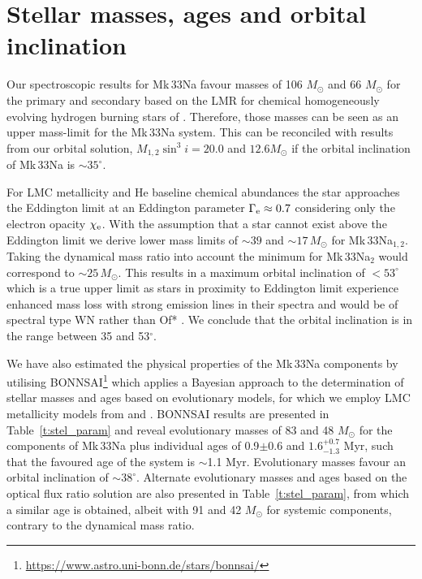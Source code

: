 \documentclass[fleqn,usenatbib]{mnras}
\begin{document}
\section{Stellar masses, ages and orbital inclination}\label{s:mass_age_i}

Our spectroscopic  results for Mk\,33Na favour masses of 106 $M_{\odot}$ and 66 $M_{\odot}$ for the primary and secondary based on the LMR for chemical homogeneously evolving hydrogen burning stars of \cite{graefener2011}. Therefore, those masses can be seen as an upper mass-limit for the Mk\,33Na system. This can be reconciled with results from our orbital solution, $M_{1,2} \sin^3 i = 20.0$ and $12.6 M_{\odot}$ if the orbital inclination of Mk\,33Na is $\sim 35^{\circ}$.

For LMC metallicity and He baseline chemical abundances the star approaches the Eddington limit at an Eddington parameter $\Gamma_{\rm e} \approx 0.7$ considering only the electron opacity $\chi_{\rm e}$. With the assumption that a star cannot exist above the Eddington limit we derive lower mass limits of $\sim 39$ and $\sim 17\,M_{\odot}$ for Mk\,33Na$_{1,2}$. Taking the dynamical mass ratio into account the minimum for Mk\,33Na$_{2}$ would correspond to $\sim 25\,M_{\odot}$. This results in a maximum orbital inclination of $< 53^{\circ}$ which is a true upper limit as stars in proximity to Eddington limit experience enhanced mass loss with strong emission lines in their spectra and would be of spectral type WN rather than Of* \citep[e.g.][]{bestenlehner2014, bestenlehner2020}. We conclude that the orbital inclination is in the range between 35 and 53$^{\circ}$.

We have also estimated the physical properties of the Mk\,33Na components by utilising BONNSAI\footnote{\url{https://www.astro.uni-bonn.de/stars/bonnsai/}} \cite{schneider2014} which applies a Bayesian approach to the determination of stellar masses and ages based on evolutionary models, for which we employ LMC metallicity models from \citet{brott2011} and \citet{koehler2015}. BONNSAI results are presented in Table~\ref{t:stel_param} and reveal evolutionary masses of 83 and 48 $M_{\odot}$ for the components of Mk\,33Na plus individual ages of 0.9$\pm$0.6 and $1.6^{+0.7}_{-1.3}$ Myr, such that the favoured age of the system is $\sim$1.1 Myr. Evolutionary masses favour an orbital inclination of $\sim 38^{\circ}$. Alternate evolutionary masses and ages based on the optical flux ratio solution are also presented in Table~\ref{t:stel_param}, from which a similar age is obtained, albeit with 91 and 42 $M_{\odot}$ for systemic components, contrary to the dynamical mass ratio.
\end{document}
